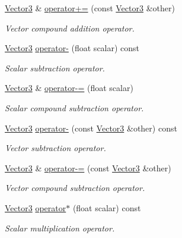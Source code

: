 \begin{DoxyCompactItemize}
\hyperlink{classchaos_1_1gfx_1_1_vector3}{Vector3} \& \hyperlink{classchaos_1_1gfx_1_1_vector3_a05bb1715123edd7d137ebe2277d0b16f}{operator+=} (const \hyperlink{classchaos_1_1gfx_1_1_vector3}{Vector3} \&other)
\begin{DoxyCompactList}\small\item\em Vector compound addition operator. \end{DoxyCompactList}\item 
\hyperlink{classchaos_1_1gfx_1_1_vector3}{Vector3} \hyperlink{classchaos_1_1gfx_1_1_vector3_a4dae54ff2ff65a8a43572e7aad2b21ba}{operator-\/} (float scalar) const 
\begin{DoxyCompactList}\small\item\em Scalar subtraction operator. \end{DoxyCompactList}\item 
\hyperlink{classchaos_1_1gfx_1_1_vector3}{Vector3} \& \hyperlink{classchaos_1_1gfx_1_1_vector3_a7da527567f0c3f950386cfde14e0c01a}{operator-\/=} (float scalar)
\begin{DoxyCompactList}\small\item\em Scalar compound subtraction operator. \end{DoxyCompactList}\item 
\hyperlink{classchaos_1_1gfx_1_1_vector3}{Vector3} \hyperlink{classchaos_1_1gfx_1_1_vector3_aa04a47959b61f1e3f1c48b8709889f9d}{operator-\/} (const \hyperlink{classchaos_1_1gfx_1_1_vector3}{Vector3} \&other) const 
\begin{DoxyCompactList}\small\item\em Vector subtraction operator. \end{DoxyCompactList}\item 
\hyperlink{classchaos_1_1gfx_1_1_vector3}{Vector3} \& \hyperlink{classchaos_1_1gfx_1_1_vector3_a66c22970fa9dc7499b894313d1c66961}{operator-\/=} (const \hyperlink{classchaos_1_1gfx_1_1_vector3}{Vector3} \&other)
\begin{DoxyCompactList}\small\item\em Vector compound subtraction operator. \end{DoxyCompactList}\item 
\hyperlink{classchaos_1_1gfx_1_1_vector3}{Vector3} \hyperlink{classchaos_1_1gfx_1_1_vector3_a39855071d6101e932fe6fb382e3a2f9e}{operator$\ast$} (float scalar) const 
\begin{DoxyCompactList}\small\item\em Scalar multiplication operator. \end{DoxyCompactList}\item 

\end{DoxyCompactItemize}

